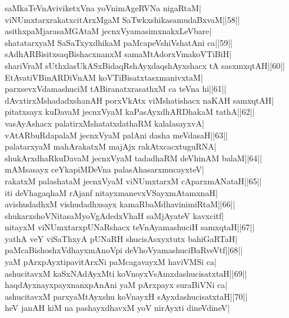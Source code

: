 \documentclass{article}
\begin{document}
saMkaTeVnAviviketxVna yoVnimAgeRVNa nigaRtaM|\\
viNUmxtarxrakatxcitArxMgaM SaTwkxshikasamudaBxvaM||58||\\
asithxpaMjarasaMGAtaM jecnxVyamasimxnakxLeVbare|\\
shatatarxyaM SaSaTxyxdhikaM paMcapeVshiVshatAni ca||59||\\
sAdhARBisitxsaqBishacxnanxM samaMtAdorxVmakoVTiBiH|\\
shariVraM sUthxlasUkASxBidaqRshAyxdaqshAyxshacx tA sasxmxqtAH||60||\\
EtAvatiVBinARDiVnAM koVTiBisatxtasxmanivxtaM|\\
parxsevxVdamashuciM tABiranatxrasathxM ca teVna hi||61||\\
dAvxtirxMshadadxshanAH porxVkAtx viMshatishacx naKAH samxqtAH|\\
pitatxsayx kuDavaM jecnxVyaM kaPasAyxdhARDhakaM tathA||62||\\
vasAyAshacx palatirxMshatatxdathaRM kalalasayxvA|\\
vAtARbuRdapalaM jecnxVyaM palAni dasha meVdasaH||63||\\
palatarxyaM mahArakatxM majAjx rakAtxcacxtuguRNA|\\
shukArxdhaRkuDavaM jecnxVyaM tadadhaRM deVhinAM balaM||64||\\
mAMsasayx ceYkapiMDeVna palasAhasarxmucayxteV|\\
rakatxM palashataM jecnxVyaM viNUmxtarxM cAparxmANataH||65||\\
iti deVhagaqhaM rAjanf nitayxmanevxVSayxmAtamxnaH|\\
avishudadhxM vishudadhxsayx kamaRbaMdhavinimiRtaM||66||\\
shukarxshoVNitasaMyoVgAdedxVhaH saMjAyateV kavxcitf|\\
nitayxM viNUmxtarxpUNaRshacx teVnAyamashuciH samxqtaH||67||\\
yathA veY viSaThxyA pUNaRH shucisAsxyxtutx bahiGaRTaH|\\
paMcaBishoshxVdhayxmAnoVpi deVhoVyamashuciBaRveVtf||68||\\
yaM pArxpAyxtipavitArxNi paMcagavayxM haviVMSi ca|\\
ashucitavxM kaSxNAdAyxMti koVnoyxVsAmxdashucisatxtaH||69||\\
haqdAyxnayxpayxnanxpAnAni yaM pArxpayx suraBiVNi ca|\\
ashucitavxM parxyaMtAyxshu koVnayxH sAyxdashucisatxtaH||70||\\
heV janAH kiM na pashayxdhavxM yoV nirAyxti dineVdineV|\\
\end{document}
